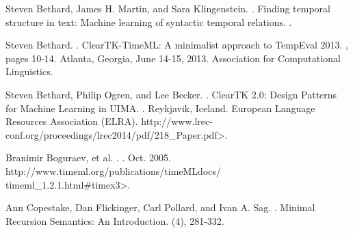 \documentclass[11pt]{article}
\begin{document}
%
%

\begin{thebibliography}{}

Steven Bethard, James H. Martin, and Sara Klingenstein.
.
\newblock Finding temporal structure in text: Machine learning of syntactic temporal relations.
.

Steven Bethard.
.
\newblock ClearTK-TimeML: A minimalist approach to TempEval 2013.
, pages 10-14.
\newblock Atlanta, Georgia, June 14-15, 2013.
\newblock Association for Computational Linguistics.

Steven Bethard, Philip Ogren, and Lee Becker.
.
\newblock ClearTK 2.0: Design Patterns for Machine Learning in UIMA.
.
\newblock Reykjavik, Iceland.
\newblock European Language Resources Association (ELRA).
\newblock {\textless}http://www.lrec-conf.org/proceedings/lrec2014/pdf/218\_Paper.pdf{\textgreater}.

Branimir Boguraev, et al.
.
.
\newblock Oct. 2005.
\newblock {\textless}http://www.timeml.org/publications/timeMLdocs/\\timeml\_1.2.1.html\#timex3{\textgreater}.


Ann Copestake, Dan Flickinger, Carl Pollard, and Ivan A. Sag.
.
\newblock Minimal Recursion Semantics: An Introduction.
(4), 281-332.



\end{thebibliography}
\end{document}

